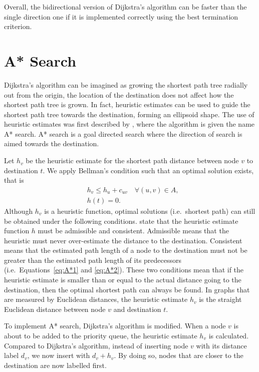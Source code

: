 Overall, the bidirectional version of Dijkstra's algorithm can be faster than the single direction one if it is implemented correctly using the best termination criterion.

\section{A* Search}\label{section:A*}
Dijkstra's algorithm can be imagined as growing the shortest path tree radially out from the origin,
the location of the destination does not affect how the shortest path tree is grown.
In fact, heuristic estimates can be used to guide the shortest path tree towards the destination,
forming an ellipsoid shape.
The use of heuristic estimates was first described by \citet{Astar},
where the algorithm is given the name A* search.
A* search is a goal directed search where the direction of search is aimed towards the destination.

Let $h_v$ be the heuristic estimate for the shortest path distance between node $v$ to destination $t$.
We apply Bellman's condition such that an optimal solution exists, that is 
\begin{align}
    &h_v \leq h_u + c_{uv} \quad \forall(u,v) \in A, \label{eq:A*1}\\
    &h(t) = 0. \label{eq:A*2}
\end{align}
Although $h_v$ is a heuristic function,
optimal solutions (i.e.\ shortest path) can still be obtained under the following conditions.
\citet{Astar} state that the heuristic estimate function $h$ must be admissible and consistent.
Admissible means that the heuristic must never over-estimate the distance to the destination.
Consistent means that the estimated path length of a node to the destination must not be greater than the estimated path length of its predecessors (i.e.\ Equations~\eqref{eq:A*1} and \eqref{eq:A*2}).
These two conditions mean that 
if the heuristic estimate is smaller than or equal to the actual distance going to the destination,
then the optimal shortest path can always be found. 
In graphs that are measured by Euclidean distances,
the heuristic estimate $h_v$ is the straight Euclidean distance between node $v$ and destination $t$.

%
To implement A* search,
Dijkstra's algorithm is modified.
When a node $v$ is about to be added to the priority queue,
the heuristic estimate $h_v$ is calculated.
Compared to Dijkstra's algorithm,
instead of inserting node $v$ with its distance label $d_v$,
we now insert with $d_v + h_v$.
By doing so,
nodes that are closer to the destination are now labelled first.

